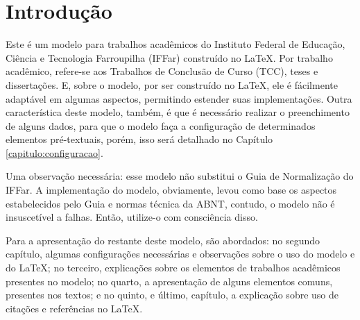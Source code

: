 \chapter{Introdução}
Este é um modelo para trabalhos acadêmicos do Instituto Federal de Educação, Ciência e Tecnologia Farroupilha (IFFar) construído no \LaTeX{}. Por trabalho acadêmico, refere-se aos Trabalhos de Conclusão de Curso (TCC), teses e dissertações. E, sobre o modelo, por ser construído no \LaTeX{}, ele é fácilmente adaptável em algumas aspectos, permitindo estender suas implementações. Outra característica deste modelo, também, é que é necessário realizar o preenchimento de alguns dados, para que o modelo faça a configuração de determinados elementos pré-textuais, porém, isso será detalhado no Capítulo \ref{capitulo:configuracao}.

Uma observação necessária: esse modelo não substitui o Guia de Normalização do IFFar. A implementação do modelo, obviamente, levou como base os aspectos estabelecidos pelo Guia e normas técnica da ABNT, contudo, o modelo não é insuscetível a falhas. Então, utilize-o com consciência disso.

Para a apresentação do restante deste modelo, são abordados: no segundo capítulo, algumas configurações necessárias e observações sobre o uso do modelo e do \LaTeX{}; no terceiro, explicações sobre os elementos de trabalhos acadêmicos presentes no modelo; no quarto, a apresentação de alguns elementos comuns, presentes nos textos; e no quinto, e último, capítulo, a explicação sobre uso de citações e referências no \LaTeX{}.